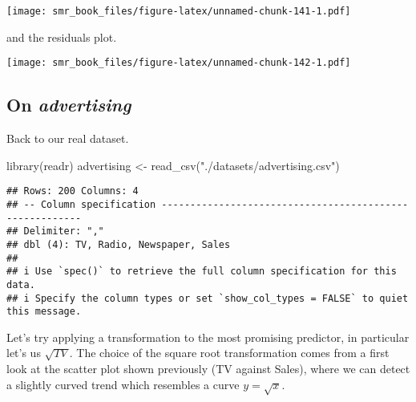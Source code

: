 \documentclass[
  oneside]{book}
\newenvironment{Shaded}{\begin{snugshade}}{\end{snugshade}}
\newcommand{\AttributeTok}[1]{\textcolor[rgb]{0.77,0.63,0.00}{#1}}
\newcommand{\CommentTok}[1]{\textcolor[rgb]{0.56,0.35,0.01}{\textit{#1}}}
\newcommand{\FunctionTok}[1]{\textcolor[rgb]{0.00,0.00,0.00}{#1}}
\newcommand{\NormalTok}[1]{#1}
\newcommand{\OtherTok}[1]{\textcolor[rgb]{0.56,0.35,0.01}{#1}}
\newcommand{\SpecialCharTok}[1]{\textcolor[rgb]{0.00,0.00,0.00}{#1}}
\newcommand{\StringTok}[1]{\textcolor[rgb]{0.31,0.60,0.02}{#1}}
\begin{document}
\texttt{[image: smr\_book\_files/figure-latex/unnamed-chunk-141-1.pdf]}

and the residuals plot.

\begin{Shaded}
\end{Shaded}

\texttt{[image: smr\_book\_files/figure-latex/unnamed-chunk-142-1.pdf]}

\hypertarget{on-advertising}{%
\subsection{\texorpdfstring{On \emph{advertising}}{On advertising}}\label{on-advertising}}

Back to our real dataset.

\begin{Shaded}
\begin{Highlighting}[]
\FunctionTok{library}\NormalTok{(readr)}
\NormalTok{advertising }\OtherTok{\textless{}{-}} \FunctionTok{read\_csv}\NormalTok{(}\StringTok{"./datasets/advertising.csv"}\NormalTok{)}
\end{Highlighting}
\end{Shaded}

\begin{verbatim}
## Rows: 200 Columns: 4
## -- Column specification --------------------------------------------------------
## Delimiter: ","
## dbl (4): TV, Radio, Newspaper, Sales
## 
## i Use `spec()` to retrieve the full column specification for this data.
## i Specify the column types or set `show_col_types = FALSE` to quiet this message.
\end{verbatim}

Let's try applying a transformation to the most promising
predictor, in particular let's us \(\sqrt{TV}\). The choice
of the square root transformation comes from a first look
at the scatter plot shown previously (TV against Sales),
where we can detect a slightly curved trend which resembles
a curve \(y = \sqrt{x}\).
\end{document}
